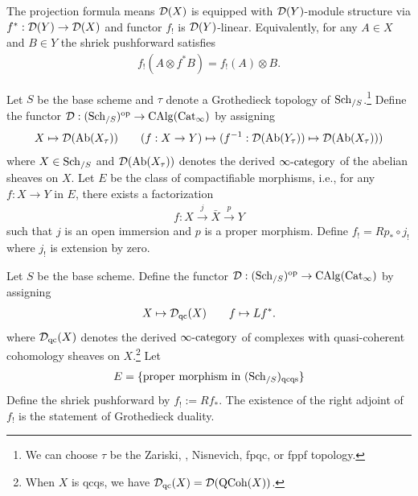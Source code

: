 The projection formula means $\mathcal{D}(X)$ is equipped with $\mathcal{D}(Y)$-module structure via $f^*:\mathcal{D}(Y)\to \mathcal{D}(X)$ and functor $f_!$ is $\mathcal{D}(Y)$-linear. Equivalently, for any $A\in X$ and $B\in Y$ the shriek pushforward satisfies
\begin{align*}
    f_!(A \otimes f^*B) = f_!(A)\otimes B.
\end{align*}

\begin{example}
    Let $S$ be the base scheme and $\tau$ denote a Grothedieck topology of $\mathrm{Sch}_{/S}$.\footnote{We can choose $\tau$ be the Zariski, \Etale, Nisnevich, fpqc, or fppf topology.}
    Define the functor $\mathcal{D}:(\mathrm{Sch}_{/S})^{\mathrm{op}} \to \operatorname{CAlg}(\mathrm{Cat}_\infty)$ by assigning
    \begin{align*}
        X \mapsto \mathcal{D}(\operatorname{Ab}(X_{\tau})) \qquad (f:X\to Y) \mapsto (f^{-1}:\mathcal{D}(\operatorname{Ab}(Y_{\tau}))\mapsto \mathcal{D}(\operatorname{Ab}(X_{\tau})))
    \end{align*}
    where $X\in \mathrm{Sch}_{/S}$ and $\mathcal{D}(\operatorname{Ab}(X_{\tau}))$ denotes the derived $\infty\text{-category}$ of  the abelian sheaves on $X$.
    Let $E$ be the class of compactifiable morphisms, i.e., for any $f:X\to Y$ in $E$, there exists a factorization
    \begin{align*}
        f:X\xrightarrow{j} \bar{X} \xrightarrow{p} Y
    \end{align*} 
    such that $j$ is an open immersion and $p$ is a proper morphism. Define $f_!=  Rp_*\circ j_!$ where $j_!$ is extension by zero.  
\end{example}

\begin{example}
    Let $S$ be the base scheme. Define the functor $\mathcal{D}:(\mathrm{Sch}_{/S})^{\mathrm{op}} \to \operatorname{CAlg}(\mathrm{Cat}_\infty)$ by assigning
    \begin{align*}
        X\mapsto \mathcal{D}_{\mathrm{qc}}(X) \qquad f \mapsto Lf^*.
    \end{align*}
    where $\mathcal{D}_{\mathrm{qc}}(X)$ denotes the derived $\infty\text{-category}$ of complexes with quasi-coherent cohomology sheaves on $X$.\footnote{When $X$ is qcqs, we have $\mathcal{D}_{\mathrm{qc}}(X)=\mathcal{D}(\mathrm{QCoh}(X))$.}
    Let 
    \begin{align*}
        E =\{\text{proper morphism in }(\mathrm{Sch}_{/S})_{\mathrm{qcqs}}\}
    \end{align*}
    Define the shriek pushforward by $f_!:= Rf_*$. The existence of the right adjoint of $f_!$ is the statement of Grothedieck duality.
\end{example}










